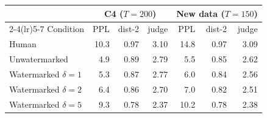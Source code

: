 \begin{tabular}{@{}l rrr rrr@{}}
\toprule
 & \multicolumn{3}{c}{C4 ($T{=}200$)} & \multicolumn{3}{c}{New data ($T{=}150$)} \\
\cmidrule(lr){2-4}\cmidrule(lr){5-7}
Condition & PPL & dist-2 & judge & PPL & dist-2 & judge \\
\midrule
Human & 10.3 & 0.97 & 3.10 & 14.8 & 0.97 & 3.09 \\
Unwatermarked & 4.9 & 0.89 & 2.79 & 5.5 & 0.85 & 2.62 \\
Watermarked $\delta{=}1$ & 5.3 & 0.87 & 2.77 & 6.0 & 0.84 & 2.56 \\
Watermarked $\delta{=}2$ & 6.4 & 0.86 & 2.70 & 7.0 & 0.82 & 2.51 \\
Watermarked $\delta{=}5$ & 9.3 & 0.78 & 2.37 & 10.2 & 0.78 & 2.38 \\
\bottomrule
\end{tabular}